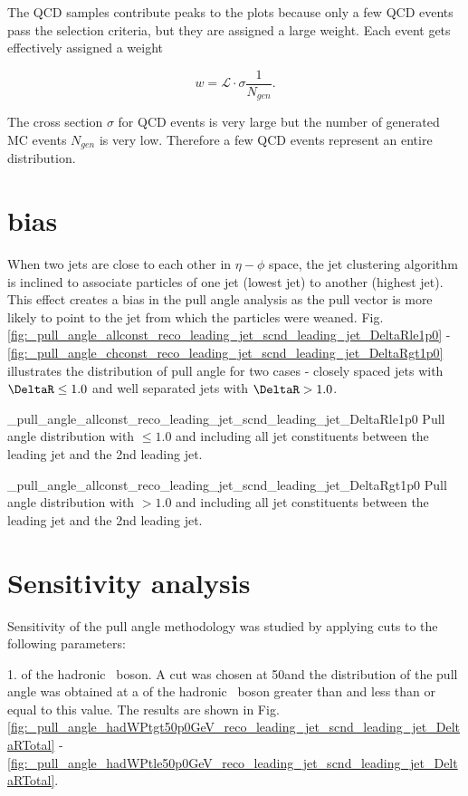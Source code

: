 The QCD samples contribute peaks to the plots because only a few QCD events pass the selection criteria, but they are assigned a large weight. Each event gets effectively assigned a weight

\begin{equation}
w=\mathcal{L}\cdot\sigma\frac{1}{N_{gen}}.
\end{equation}

The cross section $\sigma$ for QCD events is very large but the number of generated MC events $N_{gen}$ is very low. Therefore a few QCD events represent an entire distribution.

\section{\DeltaR bias}

When two jets are close to each other in $\eta-\phi$ space, the jet clustering algorithm is inclined to associate particles of one jet (lowest \pt jet) to another (highest \pt jet). This effect creates a bias in the pull angle analysis as the pull vector is more likely to point to the jet from which the particles were weaned. Fig. \ref{fig:_pull_angle_allconst_reco_leading_jet_scnd_leading_jet_DeltaRle1p0} - \ref{fig:_pull_angle_chconst_reco_leading_jet_scnd_leading_jet_DeltaRgt1p0} illustrates the distribution of pull angle for two cases - closely spaced jets with $\DeltaR\leq1.0$ and well separated jets with $\DeltaR>1.0$.

          {_pull_angle_allconst_reco_leading_jet_scnd_leading_jet_DeltaRle1p0}
          {Pull angle distribution with \DeltaR$\leq1.0$ and including all jet constituents between the leading jet and the 2nd leading jet.}

          {_pull_angle_allconst_reco_leading_jet_scnd_leading_jet_DeltaRgt1p0}
          {Pull angle distribution with \DeltaR$>1.0$ and including all jet constituents between the leading jet and the 2nd leading jet.}


\section{Sensitivity analysis}

Sensitivity of the pull angle methodology was studied by applying cuts to the following parameters:

1. \pt of the hadronic \PW\ boson. A cut was chosen at 50\GeV and the distribution of the pull angle was obtained at a \pt of the hadronic \PW\ boson greater than and less than or equal to this value. The results are shown in Fig. \ref{fig:_pull_angle_hadWPtgt50p0GeV_reco_leading_jet_scnd_leading_jet_DeltaRTotal} - \ref{fig:_pull_angle_hadWPtle50p0GeV_reco_leading_jet_scnd_leading_jet_DeltaRTotal}.

